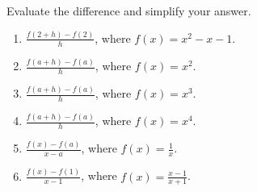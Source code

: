 Evaluate the difference and simplify your answer.
\begin{multicols}{2}
\begin{enumerate}
\item $\displaystyle \frac{f(2+h)-f(2)}{h}$, where $f(x)=x^2-x-1$.

\item $\displaystyle \frac{f(a+h)-f(a)}{h}$, where $f(x)= x^2$.

\item $\displaystyle \frac{f(a+h)-f(a)}{h}$, where $f(x)= x^3$.

\item $\displaystyle \frac{f(a+h)-f(a)}{h}$, where $f(x)= x^4$.

\item $\displaystyle \frac{f(x)-f(a)}{x-a}$, where $f(x)=\frac{1}{x}$.

\item $\displaystyle \frac{f(x)-f(1)}{x-1}$, where $f(x)=\frac{x-1}{x+1}$.

\end{enumerate}
\end{multicols}
